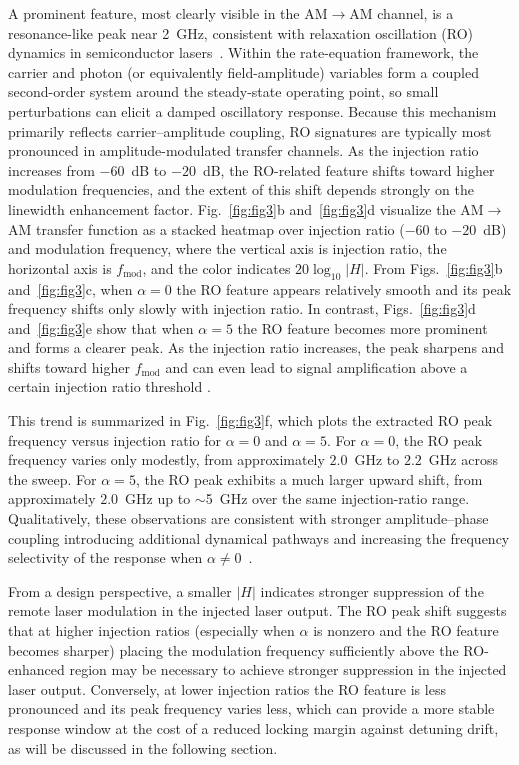 \documentclass[%
 aip,
 apl,
 amsmath,amssymb,
 reprint,%
 floatfix,
]{revtex4-1}
\begin{document}
A prominent feature, most clearly visible in the AM$\to$AM channel, is a resonance-like peak near 2~GHz, consistent with relaxation oscillation (RO) dynamics in semiconductor lasers~\cite{Lau2008JQE_FreqRespEnh_OIL,Lau2008JLT_MasterModulation_OIL_BWEnhancement}. Within the rate-equation framework, the carrier and photon (or equivalently field-amplitude) variables form a coupled second-order system around the steady-state operating point, so small perturbations can elicit a damped oscillatory response. Because this mechanism primarily reflects carrier--amplitude coupling, RO signatures are typically most pronounced in amplitude-modulated transfer channels. As the injection ratio increases from $-60$~dB to $-20$~dB, the RO-related feature shifts toward higher modulation frequencies, and the extent of this shift depends strongly on the linewidth enhancement factor. Fig.~\ref{fig:fig3}b and~\ref{fig:fig3}d visualize the AM$\to$AM transfer function as a stacked heatmap over injection ratio ($-60$ to $-20$~dB) and modulation frequency, where the vertical axis is injection ratio, the horizontal axis is $f_{\mathrm{mod}}$, and the color indicates $20\log_{10}|H|$. From Figs.~\ref{fig:fig3}b and~\ref{fig:fig3}c, when $\alpha=0$ the RO feature appears relatively smooth and its peak frequency shifts only slowly with injection ratio. In contrast, Figs.~\ref{fig:fig3}d and~\ref{fig:fig3}e show that when $\alpha=5$ the RO feature becomes more prominent and forms a clearer peak. As the injection ratio increases, the peak sharpens and shifts toward higher $f_{\mathrm{mod}}$ and can even lead to signal amplification above a certain injection ratio threshold \cite{Lau2008JLT_MasterModulation_OIL_BWEnhancement}.

This trend is summarized in Fig.~\ref{fig:fig3}f, which plots the extracted RO peak frequency versus injection ratio for $\alpha=0$ and $\alpha=5$.
For $\alpha=0$, the RO peak frequency varies only modestly, from approximately $2.0$~GHz to $2.2$~GHz across the sweep.
For $\alpha=5$, the RO peak exhibits a much larger upward shift, from approximately $2.0$~GHz up to $\sim$5~GHz over the same injection-ratio range.
Qualitatively, these observations are consistent with stronger amplitude--phase coupling introducing additional dynamical pathways and increasing the frequency selectivity of the response when $\alpha\neq 0$~\cite{Lang1982InjectionLockingProperties,HenryOlssonDutta1985LockingRangeStability}.

From a design perspective, a smaller $|H|$ indicates stronger suppression of the remote laser modulation in the injected laser output.
The RO peak shift suggests that at higher injection ratios (especially when $\alpha$ is nonzero and the RO feature becomes sharper) placing the modulation frequency sufficiently above the RO-enhanced region may be necessary to achieve stronger suppression in the injected laser output.
Conversely, at lower injection ratios the RO feature is less pronounced and its peak frequency varies less, which can provide a more stable response window at the cost of a reduced locking margin against detuning drift, as will be discussed in the following section.
\end{document}
